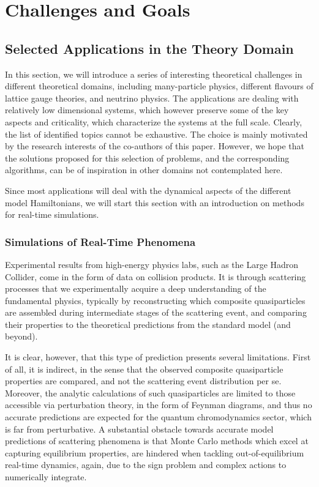 \section{Challenges and Goals\label{sec:goals}}

\subsection{Selected Applications in the Theory Domain}
\label{subsect_Theory}

In this section, we will introduce a series of interesting theoretical challenges in different theoretical domains, including many-particle physics, different flavours of lattice gauge theories, and neutrino physics. The applications are dealing with relatively low dimensional systems, which however preserve some of the key aspects and criticality, which characterize the systems at the full scale. 
Clearly, the list of identified topics cannot be exhaustive. The choice is mainly motivated by the research interests of the co-authors of this paper. 
However, we hope that the solutions proposed for this selection of problems, and the corresponding algorithms, 
can be of inspiration in other domains not contemplated here.

Since most applications will deal with the dynamical aspects of the different model Hamiltonians, we will start this section with an introduction on methods for real-time simulations. 

\subsubsection{Simulations of Real-Time Phenomena}

Experimental results from high-energy physics labs, such as the Large Hadron Collider, come in the form of data on collision products. It is through scattering processes that we experimentally acquire a deep understanding of the fundamental physics, typically by reconstructing which composite quasiparticles are assembled during intermediate stages of the scattering event, and comparing their properties to the theoretical predictions from the standard model (and beyond).

It is clear, however, that this type of prediction presents several limitations. First of all, it is indirect, in the sense that the observed composite quasiparticle properties are compared, and not the scattering event distribution per se. Moreover, the analytic calculations of such quasiparticles are limited to those accessible via perturbation theory, in the form of Feynman diagrams, and thus no accurate predictions are expected for the quantum chromodynamics sector, which is far from perturbative. A substantial obstacle towards accurate model predictions of scattering phenomena is that Monte Carlo methods which excel at capturing equilibrium properties, are hindered when tackling out-of-equilibrium real-time dynamics, again, due to the sign problem and complex actions to numerically integrate.

